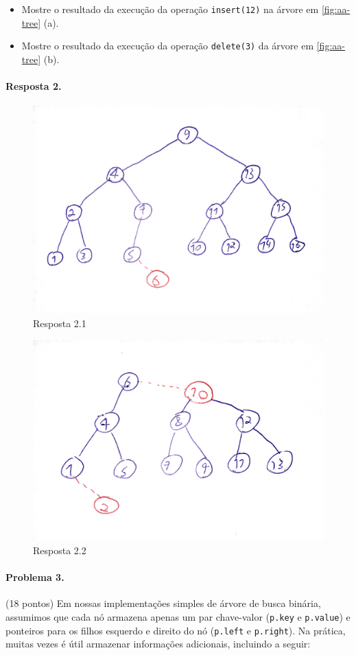 \documentclass{article}
\begin{document}
\begin{itemize}
    \item Mostre o resultado da execução da operação \texttt{insert(12)} na árvore em \autoref{fig:aa-tree} (a).
    \item Mostre o resultado da execução da operação \texttt{delete(3)} da árvore em \autoref{fig:aa-tree} (b).
\end{itemize}

\paragraph{Resposta 2.}

\clearpage
 \begin{figure}[!h]
    \centering
    \includegraphics[width = 0.7\linewidth]{figures/img3.png}
    \caption{Resposta 2.1}
    \label{fig:aa-tree}
\end{figure}

 \begin{figure}[!h]
    \centering
    \includegraphics[width = 0.7\linewidth]{figures/img4.png}
    \caption{Resposta 2.2}
    \label{fig:aa-tree}
\end{figure}
\clearpage

\paragraph{Problema 3.} (18 pontos)
Em nossas implementações simples de árvore de busca binária, assumimos que cada nó armazena
apenas um par chave-valor (\texttt{p.key} e \texttt{p.value}) e ponteiros para os filhos esquerdo e direito do nó
(\texttt{p.left} e \texttt{p.right}). Na prática, muitas vezes é útil armazenar informações adicionais, incluindo
a seguir:
\end{document}

